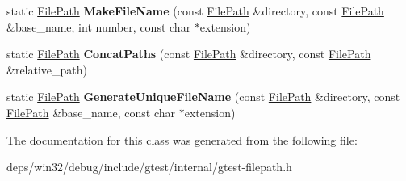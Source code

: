 \begin{DoxyCompactItemize}
\item 
\hypertarget{classtesting_1_1internal_1_1_file_path_a1e7793eaae21c6629afe8be11064b111}{}static \hyperlink{classtesting_1_1internal_1_1_file_path}{File\+Path} {\bfseries Make\+File\+Name} (const \hyperlink{classtesting_1_1internal_1_1_file_path}{File\+Path} \&directory, const \hyperlink{classtesting_1_1internal_1_1_file_path}{File\+Path} \&base\+\_\+name, int number, const char $\ast$extension)\label{classtesting_1_1internal_1_1_file_path_a1e7793eaae21c6629afe8be11064b111}

\item 
\hypertarget{classtesting_1_1internal_1_1_file_path_ad58aa6d8b160d0ba0b661f56f0980e26}{}static \hyperlink{classtesting_1_1internal_1_1_file_path}{File\+Path} {\bfseries Concat\+Paths} (const \hyperlink{classtesting_1_1internal_1_1_file_path}{File\+Path} \&directory, const \hyperlink{classtesting_1_1internal_1_1_file_path}{File\+Path} \&relative\+\_\+path)\label{classtesting_1_1internal_1_1_file_path_ad58aa6d8b160d0ba0b661f56f0980e26}

\item 
\hypertarget{classtesting_1_1internal_1_1_file_path_ab22637ea53e3918ec814dc6a5fecd1f9}{}static \hyperlink{classtesting_1_1internal_1_1_file_path}{File\+Path} {\bfseries Generate\+Unique\+File\+Name} (const \hyperlink{classtesting_1_1internal_1_1_file_path}{File\+Path} \&directory, const \hyperlink{classtesting_1_1internal_1_1_file_path}{File\+Path} \&base\+\_\+name, const char $\ast$extension)\label{classtesting_1_1internal_1_1_file_path_ab22637ea53e3918ec814dc6a5fecd1f9}

\end{DoxyCompactItemize}


The documentation for this class was generated from the following file\+:\begin{DoxyCompactItemize}
\item 
deps/win32/debug/include/gtest/internal/gtest-\/filepath.\+h\end{DoxyCompactItemize}
